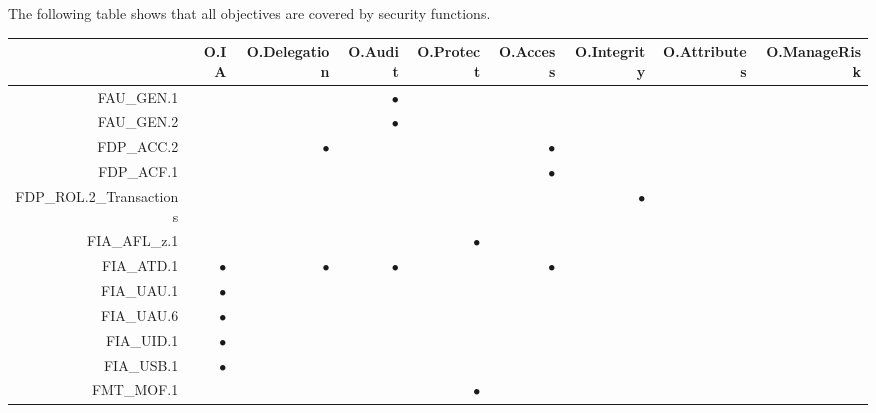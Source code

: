\documentclass[12pt,english]{scrbook}
\newcommand{\oh}{$\bullet$}
\begin{document}
The following table shows that all objectives are covered by security
functions.

\begin{longtable}{r|R|R|R|R|R|R|R|R}
        \toprule
                            & O.IA & O.Delegation & O.Audit & O.Protect & O.Access & O.Integrity & O.Attributes & O.ManageRisk \\
        \midrule\endhead

FAU\_GEN.1                  &      &              & \oh     &           &          &             &              &              \\
FAU\_GEN.2                  &      &              & \oh     &           &          &             &              &              \\
FDP\_ACC.2                  &      & \oh          &         &           & \oh      &             &              &              \\
FDP\_ACF.1                  &      &              &         &           &  \oh     &             &              &              \\
FDP\_ROL.2\_Transactions    &      &              &         &           &          &   \oh       &              &              \\
FIA\_AFL\_z.1               &      &              &         &   \oh     &          &             &              &              \\
FIA\_ATD.1                  & \oh  &  \oh         &   \oh   &           & \oh      &             &              &              \\
FIA\_UAU.1                  & \oh  &              &         &           &          &             &              &              \\
FIA\_UAU.6                  & \oh  &              &         &           &          &             &              &              \\
FIA\_UID.1                  & \oh  &              &         &           &          &             &              &              \\
FIA\_USB.1                  & \oh  &              &         &           &          &             &              &              \\
FMT\_MOF.1                  &      &              &         &  \oh      &          &             &              &              \\

\end{longtable}
\end{document}
